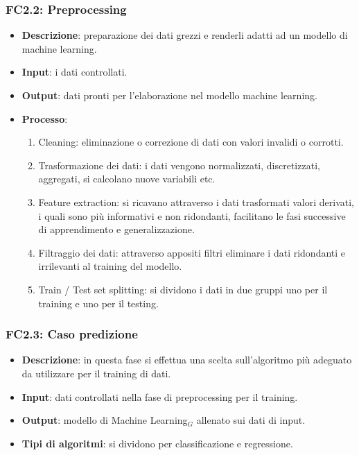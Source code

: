 \subsubsection{FC2.2: Preprocessing}

\begin{itemize}
	\item \textbf{Descrizione}: preparazione dei dati grezzi e renderli adatti ad un modello di machine learning. 
	\item \textbf{Input}: i dati controllati.
	\item \textbf{Output}: dati pronti per l'elaborazione nel modello machine learning.
	\item \textbf{Processo}: \begin{enumerate}[leftmargin = 2cm]
		\item Cleaning: eliminazione o correzione di dati con valori invalidi o corrotti.
		\item Trasformazione dei dati: i dati vengono normalizzati, discretizzati, aggregati, si calcolano nuove variabili etc.
		\item Feature extraction: si ricavano attraverso i dati trasformati valori derivati, i quali sono più informativi e non ridondanti, facilitano le fasi successive di apprendimento e generalizzazione.
		\item Filtraggio dei dati: attraverso appositi filtri eliminare i dati ridondanti e irrilevanti al training del modello.
		\item Train / Test set splitting: si dividono i dati in due gruppi uno per il training e uno per il testing.
	\end{enumerate}

\end{itemize}

\subsubsection{FC2.3: Caso predizione}

\begin{itemize}
	\item \textbf{Descrizione}: in questa fase si effettua una scelta sull'algoritmo più adeguato da utilizzare per il training di dati.
	\item \textbf{Input}: dati controllati nella fase di preprocessing per il training.
	\item \textbf{Output}: modello di Machine Learning$_G$ allenato sui dati di input.
	\item \textbf{Tipi di algoritmi}: si dividono per classificazione e regressione.%
\end{itemize}

